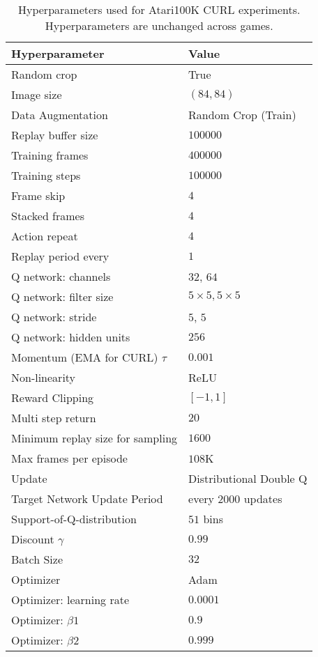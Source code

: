 \documentclass{article}
\begin{document}
\begin{table}[h]
\caption{Hyperparameters used for Atari100K CURL experiments. Hyperparameters are unchanged across games.}

\label{table:hyperparametersatari}
\vskip 0.15in
\begin{center}
\begin{small}
\begin{tabular}{ll}
\toprule
\textbf{Hyperparameter} & \textbf{Value}  \\
\midrule
Random crop    & True  \\ 
Image size    & $(84,84)$  \\ 
Data Augmentation & Random Crop (Train) \\
Replay buffer size    & $100000$ \\ 
Training frames & $400000$ \\ 
Training steps & $100000$ \\
Frame skip & $4$ \\
Stacked frames    & $4$  \\ 
Action repeat    & $4$ \\
Replay period every & $1$ \\
Q network: channels & $32$, $64$ \\
Q network: filter size & $5\times 5, 5\times 5$ \\
Q network: stride & $5$, $5$ \\
Q network: hidden units & $256$ \\
Momentum (EMA for CURL) $\tau$ & $0.001$  \\
Non-linearity & ReLU \\
Reward Clipping   & $[-1, 1]$  \\ 
Multi step return & $20$ \\
Minimum replay size for sampling & $1600$ \\ 
Max frames per episode & $108$K \\
Update & Distributional Double Q \\
Target Network Update Period & every $2000$ updates \\
Support-of-Q-distribution & $51$ bins \\ 
Discount $\gamma$ & $0.99$ \\
Batch Size & $32$  \\
Optimizer    & Adam  \\ 
Optimizer: learning rate & $0.0001$ \\
Optimizer: $\beta1$ & $0.9$ \\
Optimizer: $\beta2$ & $0.999$ \\ 

\end{tabular}
\end{small}
\end{center}
\end{table}
\end{document}
